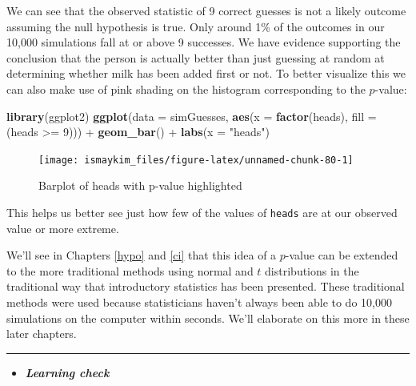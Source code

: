 \documentclass[]{tufte-book}
\newenvironment{Shaded}{\begin{snugshade}}{\end{snugshade}}
\newcommand{\KeywordTok}[1]{\textcolor[rgb]{0.13,0.29,0.53}{\textbf{{#1}}}}
\newcommand{\DataTypeTok}[1]{\textcolor[rgb]{0.13,0.29,0.53}{{#1}}}
\newcommand{\DecValTok}[1]{\textcolor[rgb]{0.00,0.00,0.81}{{#1}}}
\newcommand{\StringTok}[1]{\textcolor[rgb]{0.31,0.60,0.02}{{#1}}}
\newcommand{\NormalTok}[1]{{#1}}
\let\oldrule=\rule
\renewcommand{\rule}[1]{\oldrule{\linewidth}}
\newenvironment{rmdblock}[1]
  {\begin{shaded*}
  \begin{itemize}
  \renewcommand{\labelitemi}{
    \raisebox{-.7\height}[0pt][0pt]{
    }
  }
  \item
  }
  {
  \end{itemize}
  \end{shaded*}
  }
\newenvironment{learncheck}
  {\begin{rmdblock}{warning}}
  {\end{rmdblock}}
\begin{document}
We can see that the observed statistic of 9 correct guesses is not a
likely outcome assuming the null hypothesis is true. Only around 1\% of
the outcomes in our 10,000 simulations fall at or above 9 successes. We
have evidence supporting the conclusion that the person is actually
better than just guessing at random at determining whether milk has been
added first or not. To better visualize this we can also make use of
pink shading on the histogram corresponding to the \(p\)-value:

\begin{Shaded}
\begin{Highlighting}[]
\KeywordTok{library}\NormalTok{(ggplot2)}
  \KeywordTok{ggplot}\NormalTok{(}\DataTypeTok{data =} \NormalTok{simGuesses, }\KeywordTok{aes}\NormalTok{(}\DataTypeTok{x =} \KeywordTok{factor}\NormalTok{(heads), }\DataTypeTok{fill =} \NormalTok{(heads >=}\StringTok{ }\DecValTok{9}\NormalTok{))) +}
\StringTok{  }\KeywordTok{geom_bar}\NormalTok{() +}
\StringTok{  }\KeywordTok{labs}\NormalTok{(}\DataTypeTok{x =} \StringTok{"heads"}\NormalTok{)}
\end{Highlighting}
\end{Shaded}

\begin{figure}

{\centering \texttt{[image: ismaykim\_files/figure-latex/unnamed-chunk-80-1]} 

}

\caption[Barplot of heads with p-value highlighted]{Barplot of heads with p-value highlighted}\label{fig:unnamed-chunk-80}
\end{figure}

This helps us better see just how few of the values of \texttt{heads}
are at our observed value or more extreme.

We'll see in Chapters \ref{hypo} and \ref{ci} that this idea of a
\(p\)-value can be extended to the more traditional methods using normal
and \(t\) distributions in the traditional way that introductory
statistics has been presented. These traditional methods were used
because statisticians haven't always been able to do 10,000 simulations
on the computer within seconds. We'll elaborate on this more in these
later chapters.

\begin{center}\rule{0.5\linewidth}{\linethickness}\end{center}

\begin{learncheck}
\textbf{\emph{Learning check}}
\end{learncheck}
\end{document}
